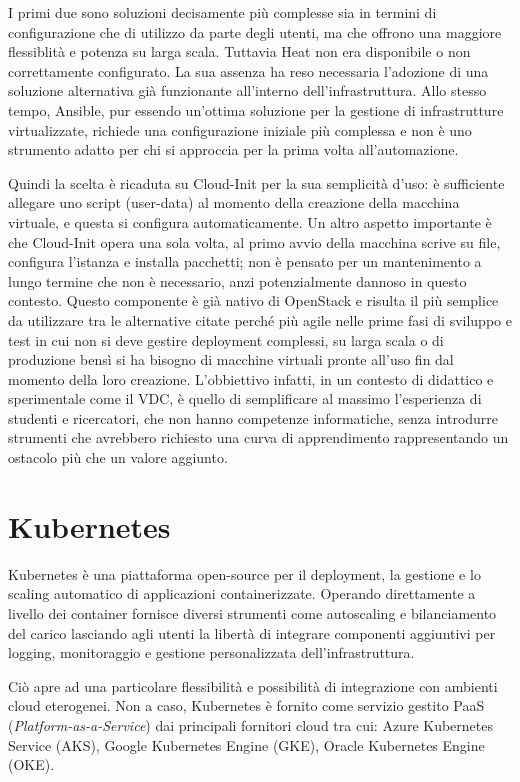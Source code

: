 \documentclass[12pt,a4paper,openright,twoside]{book}
\begin{document}
I primi due sono soluzioni decisamente più complesse sia in termini di configurazione che di utilizzo da parte degli utenti, ma che offrono una maggiore flessiblità e potenza su larga scala.
Tuttavia Heat non era disponibile o non correttamente configurato. La sua assenza ha reso necessaria l'adozione di una soluzione alternativa già funzionante all'interno dell'infrastruttura.
Allo stesso tempo, Ansible, pur essendo un'ottima soluzione per la gestione di infrastrutture virtualizzate, richiede una configurazione iniziale più complessa e non è uno strumento adatto per chi si approccia
per la prima volta all'automazione.

Quindi la scelta è ricaduta su Cloud-Init per la sua semplicità d'uso: è sufficiente allegare uno script (user-data) al momento della creazione della macchina virtuale, e questa si configura automaticamente.
Un altro aspetto importante è che Cloud-Init opera una sola volta, al primo avvio della macchina scrive su file, configura l'istanza e installa pacchetti; non è pensato per un mantenimento a lungo termine che non è necessario,
anzi potenzialmente dannoso in questo contesto. 
Questo componente è già nativo di OpenStack e risulta il più semplice da utilizzare tra le alternative citate perché più agile nelle prime fasi di sviluppo e test in cui non si deve gestire deployment complessi, su larga scala o
di produzione bensì si ha bisogno di macchine virtuali pronte all'uso fin dal momento della loro creazione.
L'obbiettivo infatti, in un contesto di didattico e sperimentale come il VDC, è quello di semplificare al massimo l'esperienza di studenti e ricercatori, che non hanno competenze informatiche, senza introdurre strumenti che avrebbero richiesto una curva di apprendimento
rappresentando un ostacolo più che un valore aggiunto.

%
\section{Kubernetes}
\label{sec:kube}
%
%
Kubernetes è una piattaforma open-source per il deployment, la gestione e lo scaling automatico di applicazioni containerizzate. 
Operando direttamente a livello dei container fornisce diversi strumenti come autoscaling e bilanciamento del carico lasciando agli utenti la libertà di integrare componenti aggiuntivi per logging, monitoraggio e gestione personalizzata dell'infrastruttura.

Ciò apre ad una particolare flessibilità e possibilità di integrazione con ambienti cloud eterogenei. Non a caso, Kubernetes è fornito come servizio gestito PaaS (\textit{Platform-as-a-Service}) dai principali fornitori cloud tra cui: Azure Kubernetes Service (AKS), Google Kubernetes Engine (GKE), Oracle Kubernetes Engine (OKE).
\end{document}
